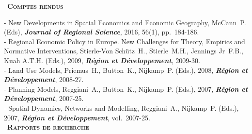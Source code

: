 \documentclass[a4paper,12pt]{article}
\newcommand{\smalltitre}[1]{%
	\noindent \textbullet~\textsc{\textbf{#1}}
	\smallskip
	}
\begin{document}

\smalltitre{Comptes rendus} \medskip

\noindent - New Developments in Spatial Economics and Economic Geography, McCann~P. (Eds), \textit{\textbf{Journal of Regional Science}}, 2016, 56(1), pp.~184-186. \\
- Regional Economic Policy in Europe. New Challenges for Theory, Empirics and Normative Interventions, Stierle-Von Schütz~H., Stierle~M.H., Jennings Jr~F.B., Kuah A.T.H. (Eds.), 2009, \textit{\textbf{Région et Développement}}, 2009-30.\\
- Land Use Models, Priemus~H., Button~K., Nijkamp~P. (Eds.), 2008, \textit{\textbf{Région et Développement}}, 2008-27. \\
- Planning Models, Reggiani~A., Button~K., Nijkamp~P. (Eds.), 2007, \textit{\textbf{Région et Développement}}, 2007-25. \\
- Spatial Dynamics, Networks and Modelling, Reggiani~A., Nijkamp~P. (Eds.), 2007, \textit{\textbf{Région et Développement}}, vol.~2007-25. \\


\smalltitre{Rapports de recherche} \medskip
\end{document}
